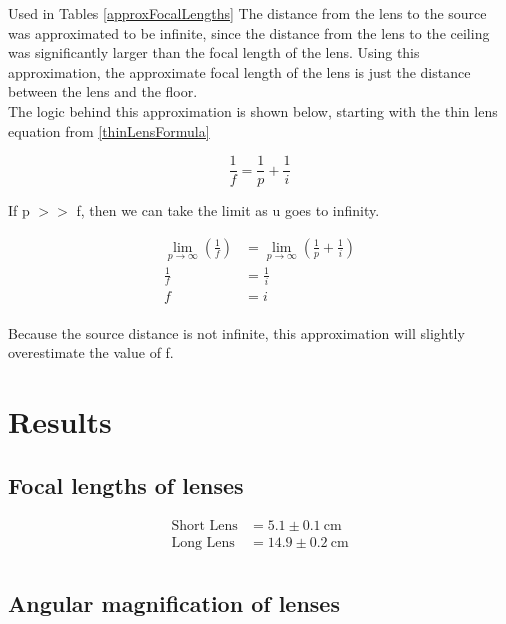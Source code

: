 \documentclass{report}
\begin{document}
\label{question2}
Used in Tables \ref{approxFocalLengths}
\newline
\newline
The distance from the lens to the source was approximated to be infinite, since the distance from the lens to the ceiling was significantly larger than the focal length of the lens. Using this approximation, the approximate focal length of the lens is just the distance between the lens and the floor. \\
\newline
The logic behind this approximation is shown below, starting with the thin lens equation from \ref{thinLensFormula}

$$
    \frac{1}{f} = \frac{1}{p} + \frac{1}{i}
$$

If p $>>$ f, then we can take the limit as u goes to infinity.

$$
    \begin{aligned}
        \lim_{p\to\infty}(\frac{1}{f}) & = \lim_{p\to\infty}(\frac{1}{p} + \frac{1}{i}) \\
        \frac{1}{f}                    & = \frac{1}{i}                                  \\
        f                              & = i
    \end{aligned}
$$
\\
Because the source distance is not infinite, this approximation will slightly overestimate the value of f.




\chapter{Results}


\section*{Focal lengths of lenses}

\begin{equation*}
    \begin{aligned}
        \text{Short Lens} & = 5.1 \pm 0.1 \ \mathrm{cm} \\
        \text{Long Lens}  & = 14.9 \pm 0.2 \ \mathrm{cm}\\
    \end{aligned}
\end{equation*}


\section*{Angular magnification of lenses}
\end{document}
